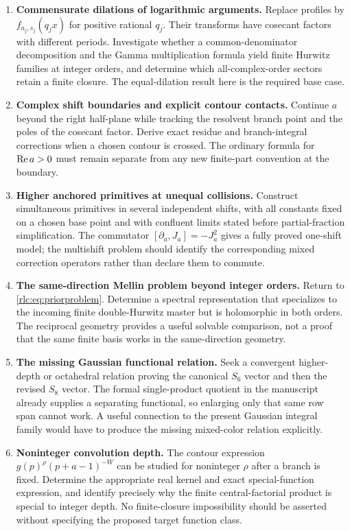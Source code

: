 \begin{enumerate}[label=\textbf{Q\arabic*.},leftmargin=2.8em,itemsep=8pt]
\item \textbf{Commensurate dilations of logarithmic arguments.}
Replace profiles by $f_{a_j,s_j}(q_jx)$ for positive rational $q_j$.
Their transforms have cosecant factors with different periods.
Investigate whether a common-denominator decomposition and the Gamma
multiplication formula yield finite Hurwitz families at integer orders,
and determine which all-complex-order sectors retain a finite closure.
The equal-dilation result here is the required base case.

\item \textbf{Complex shift boundaries and explicit contour contacts.}
Continue $a$ beyond the right half-plane while tracking the resolvent
branch point and the poles of the cosecant factor. Derive exact residue
and branch-integral corrections when a chosen contour is crossed.
The ordinary formula for $\operatorname{Re} a>0$ must remain separate from any new
finite-part convention at the boundary.

\item \textbf{Higher anchored primitives at unequal collisions.}
Construct simultaneous primitives in several independent shifts, with
all constants fixed on a chosen base point and with confluent limits
stated before partial-fraction simplification. The commutator
$[\partial_a,J_a]=-J_a^2$ gives a fully proved one-shift model; the
multishift problem should identify the corresponding mixed correction
operators rather than declare them to commute.

\item \textbf{The same-direction Mellin problem beyond integer orders.}
Return to \eqref{rlc:eq:priorproblem}. Determine a spectral representation
that specializes to the incoming finite double-Hurwitz master but is
holomorphic in both orders. The reciprocal geometry provides a useful
solvable comparison, not a proof that the same finite basis works in the
same-direction geometry.

\item \textbf{The missing Gaussian functional relation.}
Seek a convergent higher-depth or octahedral relation proving the
canonical $S_6$ vector and then the revised $S_8$ vector. The formal
single-product quotient in the manuscript already supplies a separating
functional, so enlarging only that same row span cannot work. A useful
connection to the present Gaussian integral family would have to
produce the missing mixed-color relation explicitly.

\item \textbf{Noninteger convolution depth.}
The contour expression $g(p)^\rho(p+a-1)^{-W}$ can be studied for
noninteger $\rho$ after a branch is fixed. Determine the appropriate
real kernel and exact special-function expression, and identify
precisely why the finite central-factorial product is special to
integer depth. No finite-closure impossibility should be asserted
without specifying the proposed target function class.


\end{enumerate}
